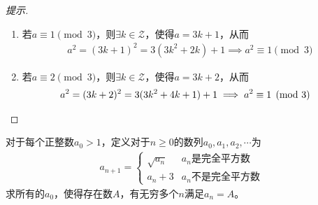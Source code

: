 \begin{proof}[提示]
\begin{enumerate}
  \item 若$a\equiv1\pmod3$，则$\exists k\in\mathcal{Z}$，使得$a=3k+1$，从而
    \begin{align*}
      a^2 = (3k+1)^2 = 3(3k^2 + 2k) + 1 \implies a^2\equiv 1\pmod3
    \end{align*}

  \item 若$a\equiv2\pmod3$，则$\exists k\in\mathcal{Z}$，使得$a=3k+2$，从而
    \begin{align*}
      a^2=(3k+2)^2=3(3k^2+4k+1)+1 \implies a^2\equiv 1\pmod3 &\qedhere
    \end{align*}
  \end{enumerate}
\end{proof}


\begin{example}[IMO 2017]
  对于每个正整数$a_0>1$，定义对于$n\ge0$的数列$a_0,a_1,a_2,\cdots$为
  \begin{align*}
    a_{n+1} = 
    \begin{cases}
      \sqrt{a_n} & a_n\text{是完全平方数}\\
      a_n + 3    & a_n\text{不是完全平方数}
    \end{cases}
  \end{align*}
  求所有的$a_0$，使得存在数$A$，有无穷多个$n$满足$a_n=A$。
\end{example}
